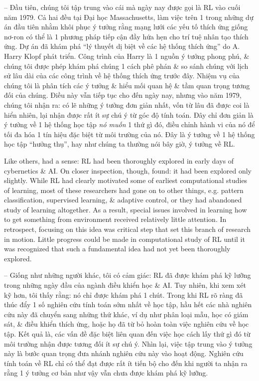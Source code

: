 \documentclass{article}
\begin{document}
\begin{itemize}
    -- Đầu tiên, chúng tôi tập trung vào cái mà ngày nay được gọi là RL vào cuối năm 1979. Cả hai đều tại Đại học Massachusetts, làm việc trên 1 trong những dự án đầu tiên nhằm khôi phục ý tưởng rằng mạng lưới các yếu tố thích ứng giống nơ-ron có thể là 1 phương pháp tiếp cận đầy hứa hẹn cho trí tuệ nhân tạo thích ứng. Dự án đã khám phá ``lý thuyết dị biệt về các hệ thống thích ứng'' do {\sc A. Harry Klopf} phát triển. Công trình của Harry là 1 nguồn ý tưởng phong phú, \& chúng tôi được phép khám phá chúng 1 cách phê phán \& so sánh chúng với lịch sử lâu dài của các công trình về hệ thống thích ứng trước đây. Nhiệm vụ của chúng tôi là phân tích các ý tưởng \& hiểu mối quan hệ \& tầm quan trọng tương đối của chúng. Điều này vẫn tiếp tục cho đến ngày nay, nhưng vào năm 1979, chúng tôi nhận ra: có lẽ những ý tưởng đơn giản nhất, vốn từ lâu đã được coi là hiển nhiên, lại nhận được rất ít sự chú ý từ góc độ tính toán. Đây chỉ đơn giản là ý tưởng về 1 hệ thống học tập {\it nó muốn} 1 thứ gì đó, điều chỉnh hành vi của nó để tối đa hóa 1 tín hiệu đặc biệt từ môi trường của nó. Đây là ý tưởng về 1 hệ thống học tập ``hưởng thụ'', hay như chúng ta thường nói bây giờ, ý tưởng về RL.

    Like others, had a sense: RL had been thoroughly explored in early days of cybernetics \& AI. On closer inspection, though, found: it had been explored only slightly. While RL had clearly motivated some of earliest computational studies of learning, most of these researchers had gone on to other things, e.g. pattern classification, supervised learning, \& adaptive control, or they had abandoned study of learning altogether. As a result, special issues involved in learning how to get something from environment received relatively little attention. In retrospect, focusing on this idea was critical step that set this branch of research in motion. Little progress could be made in computational study of RL until it was recognized that such a fundamental idea had not yet been thoroughly explored.

    -- Giống như những người khác, tôi có cảm giác: RL đã được khám phá kỹ lưỡng trong những ngày đầu của ngành điều khiển học \& AI. Tuy nhiên, khi xem xét kỹ hơn, tôi thấy rằng: nó chỉ được khám phá 1 chút. Trong khi RL rõ ràng đã thúc đẩy 1 số nghiên cứu tính toán sớm nhất về học tập, hầu hết các nhà nghiên cứu này đã chuyển sang những thứ khác, ví dụ như phân loại mẫu, học có giám sát, \& điều khiển thích ứng, hoặc họ đã từ bỏ hoàn toàn việc nghiên cứu về học tập. Kết quả là, các vấn đề đặc biệt liên quan đến việc học cách lấy thứ gì đó từ môi trường nhận được tương đối ít sự chú ý. Nhìn lại, việc tập trung vào ý tưởng này là bước quan trọng đưa nhánh nghiên cứu này vào hoạt động. Nghiên cứu tính toán về RL chỉ có thể đạt được rất ít tiến bộ cho đến khi người ta nhận ra rằng 1 ý tưởng cơ bản như vậy vẫn chưa được khám phá kỹ lưỡng.


\end{itemize}
\end{document}
